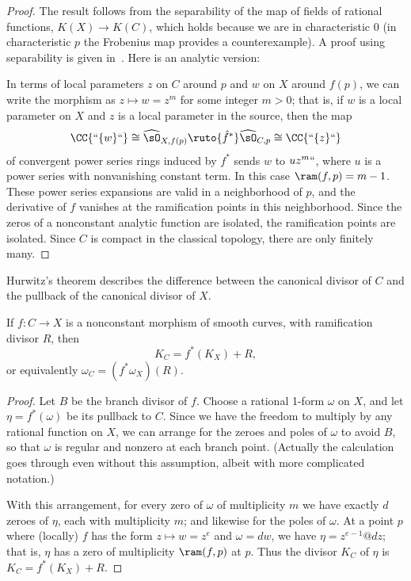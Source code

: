 \begin{proof}
The result follows from the separability of the map of fields of rational functions, $K(X) \to K(C)$, which holds because we
are in characteristic 0 (in characteristic $p$ the 
Frobenius map
%
provides a counterexample). A proof using separability
is given in~\cite[Section IV.2]{Hartshorne1977}. Here is an analytic version:

In terms of local parameters $z$ on $C$ around $p$ and $w$ on $X$ around $f(p)$, we can write the morphism as $z \mapsto w = z^m$ for some integer $m > 0$; that is,
if $w$ is a local parameter on $X$ and $z$ is a local parameter in the source, then
the map
$$
 \CC\{` `\{w\}` `\} \cong \widehat\sO_{X,f(p)} \ruto{\hat f^*}\widehat\sO_{C,p}\cong  \CC\{` `\{z\}` `\} 
$$ 
of convergent power series rings induced by $f^*$
sends $w$ to $uz^m` `$, where $u$ is a power series with nonvanishing constant term.
In this case $\ram(f,p) = m-1$. These power series expansions are valid in a neighborhood
of $p$, and the derivative of $f$ vanishes at the ramification points in this neighborhood. Since
the zeros of a nonconstant analytic function are isolated, the ramification points are isolated. 
Since $C$ is compact in the classical topology, there are only finitely many.
\end{proof}

Hurwitz's theorem describes the difference between the canonical
divisor of $C$ and the pullback of the canonical divisor of $X$.
%

\begin{theorem} 
{\rm\cite[Proposition IV.2.3]{Hartshorne1977}} \label{Hurwitz}
If $f:C\to X$ is a nonconstant morphism of smooth curves, with ramification divisor $R$, then 
$$
K_C = f^{*}(K_{X})+R,$$
or equivalently
$
\omega_{C} = (f^{*}\omega_{X})(R).
$
\unif
\end{theorem}
 
\begin{proof}
Let $B$ be the branch divisor of $f$.
Choose a rational 1-form $\omega$ on $X$, and let $\eta = f^*(\omega)$
be its pullback to $C$. 
Since we have the freedom to multiply by any rational function on $X$,
we can arrange for 
the zeroes and poles of $\omega$ to 
avoid
$B$, so that $\omega$ 
is
regular and nonzero at each branch point. (Actually the calculation
goes through even without this assumption, albeit with more
complicated notation.)  

With this arrangement,
for every zero of $\omega$ of multiplicity $m$ we have exactly $d$
zeroes of $\eta$, each with multiplicity $m$; and likewise for the
poles of $\omega$. 
 At a point $p$ where (locally) $f$ has the form $z \mapsto w = z^{e}$
and $\omega = dw$, we have $\eta = z^{e-1}@dz$; that is, $\eta$ has a zero of multiplicity $\ram(f,p)$ at  $p$.
Thus the divisor $K_{C}$ of $\eta$ is
$K_{C} = f^{*}(K_{X})+R$.
\end{proof}

